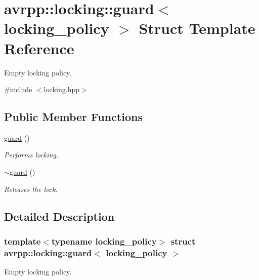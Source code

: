 \hypertarget{structavrpp_1_1locking_1_1guard}{
\section{avrpp::locking::guard$<$ locking\_\-policy $>$ Struct Template Reference}
\label{structavrpp_1_1locking_1_1guard}
}


Empty locking policy.  




{\ttfamily \#include $<$locking.hpp$>$}

\subsection*{Public Member Functions}
\begin{DoxyCompactItemize}
\item 
\hyperlink{structavrpp_1_1locking_1_1guard_acef0f5ff9484d8e01df911c22c636753}{guard} ()
\begin{DoxyCompactList}\small\item\em Performs locking. \item\end{DoxyCompactList}\item 
\hyperlink{structavrpp_1_1locking_1_1guard_a90a27ff332bd9806b44149b1f1cd9726}{$\sim$guard} ()
\begin{DoxyCompactList}\small\item\em Releases the lock. \item\end{DoxyCompactList}\end{DoxyCompactItemize}


\subsection{Detailed Description}
\subsubsection*{template$<$typename locking\_\-policy$>$ struct avrpp::locking::guard$<$ locking\_\-policy $>$}

Empty locking policy. 

